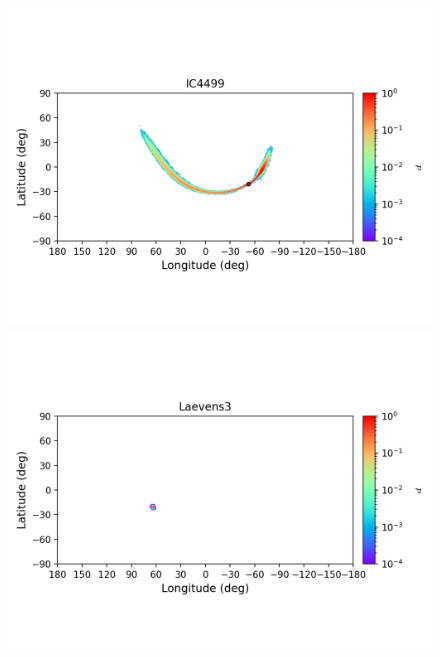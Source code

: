 \begin{figure}
\begin{center}
                \includegraphics[clip=true, trim = 0mm 20mm 0mm 10mm, width=1\columnwidth]{images/error_plots_IC4499.png}
                \includegraphics[clip=true, trim = 0mm 20mm 0mm 10mm, width=1\columnwidth]{images/error_plots_Laevens3.png}
                

\end{center}
\end{figure}
